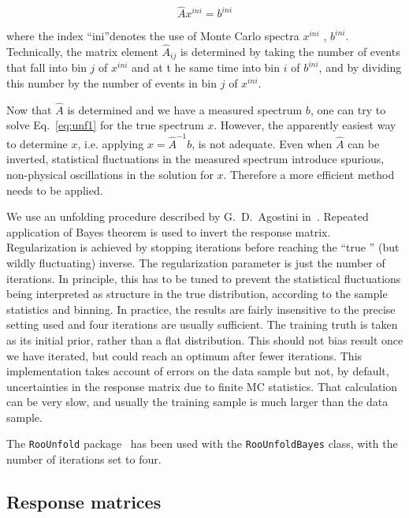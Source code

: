 \begin{equation}
\hat{A} x^{ini} = b^{ini}
\end{equation}


\noindent where the index ``ini''denotes the use of Monte Carlo spectra $x^{ini}$ , $b^{ini}$. Technically, the matrix element $\hat{A}_{ij}$ is determined by taking the number of events that fall into bin $j$ of $x^{ini}$ and at t
he same time into bin $i$ of $b^{ini}$, and by dividing this number by the number of events in bin $j$ of $x^{ini}$.

Now that $\hat{A}$ is determined and we have a measured spectrum $b$, one can try to solve Eq.~\ref{eq:unf1} for the true spectrum $x$. However, the apparently easiest way to determine $x$, i.e. applying $x = \hat{A}^{-1}b$, is not
 adequate. Even when $\hat{A}$ can be inverted, statistical fluctuations in the measured spectrum introduce spurious, non-physical oscillations in the solution for $x$. Therefore a more efficient method needs to be applied. 

We use an unfolding procedure described by G.~D.~Agostini in~\cite{agostini}. Repeated application of Bayes theorem is used to invert the response matrix. Regularization is achieved by stopping iterations before reaching the ``true
'' (but wildly fluctuating) inverse. The regularization parameter is just the number of iterations.
 In principle, this has to be tuned to prevent the statistical fluctuations being interpreted as structure in the true distribution, according to the sample statistics and binning. In practice, the results are fairly insensitive to
 the precise setting used and four iterations are usually sufficient.
The training truth is taken as its initial prior, rather than a flat distribution. This should not bias result once we have iterated, but could reach an optimum after fewer iterations.
This implementation takes account of errors on the data sample but not, by default, uncertainties in the response matrix due to finite MC statistics. That calculation can be very slow, and usually the training sample is much larger
 than the data sample.

\ifnpas
The {\tt RooUnfold} package~\cite{roounfold} has been used with the {\tt RooUnfoldBayes} class,
with the number of iterations set to four. 
\fi

\subsection{Response matrices}


